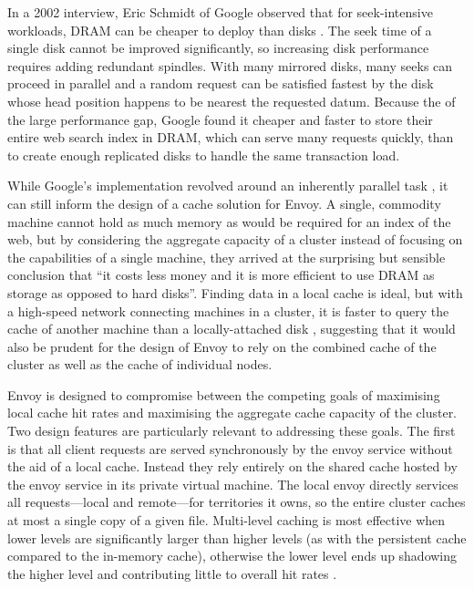 In a 2002 interview, Eric Schmidt of Google observed that for seek-intensive workloads, DRAM can be cheaper to deploy than disks \cite{spring}. The seek time of a single disk cannot be improved significantly, so increasing disk performance requires adding redundant spindles. With many mirrored disks, many seeks can proceed in parallel and a random request can be satisfied fastest by the disk whose head position happens to be nearest the requested datum. Because the of the large performance gap, Google found it cheaper and faster to store their entire web search index in DRAM, which can serve many requests quickly, than to create enough replicated disks to handle the same transaction load.

While Google's implementation revolved around an inherently parallel task \cite{barroso03}, it can still inform the design of a cache solution for Envoy. A single, commodity machine cannot hold as much memory as would be required for an index of the web, but by considering the aggregate capacity of a cluster instead of focusing on the capabilities of a single machine, they arrived at the surprising but sensible conclusion that ``it costs less money and it is more efficient to use DRAM as storage as opposed to hard disks''. Finding data in a local cache is ideal, but with a high-speed network connecting machines in a cluster, it is faster to query the cache of another machine than a locally-attached disk \cite{dahlin94b}, suggesting that it would also be prudent for the design of Envoy to rely on the combined cache of the cluster as well as the cache of individual nodes.

Envoy is designed to compromise between the competing goals of maximising local cache hit rates and maximising the aggregate cache capacity of the cluster. Two design features are particularly relevant to addressing these goals. The first is that all client requests are served synchronously by the envoy service without the aid of a local cache. Instead they rely entirely on the shared cache hosted by the envoy service in its private virtual machine. The local envoy directly services all requests---local and remote---for territories it owns, so the entire cluster caches at most a single copy of a given file. Multi-level caching is most effective when lower levels are significantly larger than higher levels (as with the persistent cache compared to the in-memory cache), otherwise the lower level ends up shadowing the higher level and contributing little to overall hit rates \cite{muntz}.

